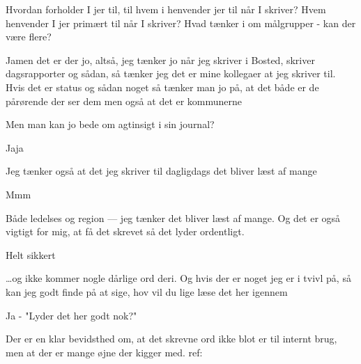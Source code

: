 \begin{description}

\MAA
Hvordan forholder I jer til, til hvem i henvender jer til når I skriver?
Hvem henvender I jer primært til når I skriver?
Hvad tænker i om målgrupper - kan der være flere?

\DMC
Jamen det er der jo, altså, jeg tænker jo når jeg skriver i Bosted, skriver dagsrapporter og sådan, så tænker jeg det er mine kollegaer at jeg skriver til.
Hvis det er status og sådan noget så tænker man jo på, at det både er de pårørende der ser dem men også at det er kommunerne

\MAA
Men man kan jo bede om agtinsigt i sin journal?

\DMC
Jaja

\AMB
Jeg tænker også at det jeg skriver til dagligdags det bliver læst af mange

\DMC
Mmm

\AMB
Både ledelses og region — jeg tænker det bliver læst af mange.
Og det er også vigtigt for mig, at få det skrevet så det lyder ordentligt.

\DMC
Helt sikkert

\AMB
\ldots og ikke kommer nogle dårlige ord deri.
Og hvis der er noget jeg er i tvivl på, så kan jeg godt finde på at sige, hov vil du lige læse det her igennem

\DMC
Ja - "Lyder det her godt nok?"
\end{description}

Der er en klar bevidsthed om, at det skrevne ord ikke blot er til internt brug, men at der er mange øjne der kigger med.
ref: \autocite{hjerrildNarViSkriver2017, andersenUndervisningInstitutionOg2019}

